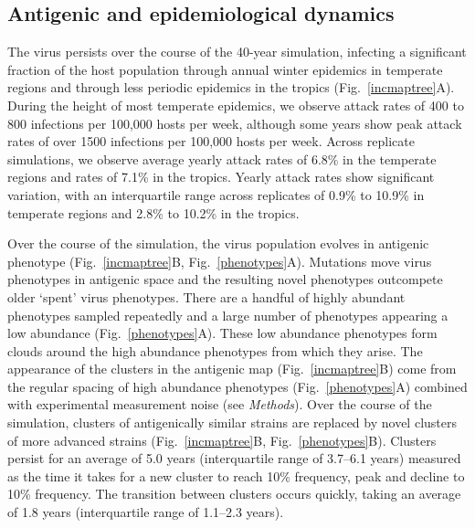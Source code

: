 \documentclass[11pt,oneside,letterpaper]{article}
\begin{document}
\subsection*{Antigenic and epidemiological dynamics}

The virus persists over the course of the 40-year simulation, infecting a significant fraction of the host population through annual winter epidemics in temperate regions and through less periodic epidemics in the tropics (Fig.~\ref{incmaptree}A).  During the height of most temperate epidemics, we observe attack rates of 400 to 800 infections per 100,000 hosts per week, although some years show peak attack rates of over 1500 infections per 100,000 hosts per week.  Across replicate simulations, we observe average yearly attack rates of 6.8\% in the temperate regions and rates of 7.1\% in the tropics.  Yearly attack rates show significant variation, with an interquartile range across replicates of 0.9\% to 10.9\% in temperate regions and 2.8\% to 10.2\% in the tropics.  

Over the course of the simulation, the virus population evolves in antigenic phenotype (Fig.~\ref{incmaptree}B, Fig.~\ref{phenotypes}A).  Mutations move virus phenotypes in antigenic space and the resulting novel phenotypes outcompete older `spent' virus phenotypes.  There are a handful of highly abundant phenotypes sampled repeatedly and a large number of phenotypes appearing a low abundance (Fig.~\ref{phenotypes}A).  These low abundance phenotypes form clouds around the high abundance phenotypes from which they arise.  The appearance of the clusters in the antigenic map (Fig.~\ref{incmaptree}B) come from the regular spacing of high abundance phenotypes (Fig.~\ref{phenotypes}A) combined with experimental measurement noise (see \textsl{Methods}).  Over the course of the simulation, clusters of antigenically similar strains are replaced by novel clusters of more advanced strains (Fig.~\ref{incmaptree}B, Fig.~\ref{phenotypes}B).  Clusters persist for an average of 5.0 years (interquartile range of 3.7--6.1 years) measured as the time it takes for a new cluster to reach 10\% frequency, peak and decline to 10\% frequency.  The transition between clusters occurs quickly, taking an average of 1.8 years (interquartile range of 1.1--2.3 years).
\end{document}

